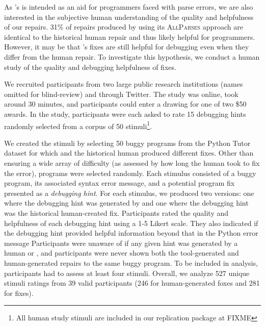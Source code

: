 As \toolname's is intended as an aid for programmers
faced with parse errors, we are also interested in the subjective
human understanding of the quality
and helpfulness of our repairs. 31\% of repairs produced by \toolname
using its \textsc{AllParses} approach are identical to the historical human repair
and thus likely helpful for programmers. However, it may be that \toolname's fixes
are still helpful for debugging even when they differ from the human
repair. To investigate this hypothesis, we conduct a human study of the quality and
debugging helpfulness of \toolname fixes.

 We recruited participants from two large public
research institutions (names omitted for blind-review) and through Twitter.
The study was online, took around 30 minutes, and participants could enter a
drawing for one of two \$50 awards. In the study, participants
were each asked to rate 15 debugging hints randomly selected from a corpus of 50
stimuli\footnote{All human study stimuli are included in our replication
package at FIXME}.

We created the stimuli by selecting 50 buggy programs from the Python Tutor dataset
for which \toolname and the historical human produced different fixes. Other than
ensuring a wide array of difficulty (as assessed by how long the
human took to fix the error), programs were selected randomly. Each
stimulus consisted of a buggy program, its associated syntax
error message, and a potential program fix presented as a \emph{debugging hint}.
For each stimulus, we produced two versions: one where the debugging hint was
generated by \toolname and one where the debugging hint was the historical
human-created fix.
Participants rated the quality and helpfulness of each debugging
hint using a 1-5 Likert scale.
They also indicated if the debugging hint provided helpful information beyond
that in the Python error message %
Participants were unaware of if any given
hint was generated by a human or \toolname, and participants were never shown both the
tool-generated and human-generated repairs to the same buggy program. To be included
in analysis, participants had to assess at
least four stimuli. Overall, we analyze 527 unique stimuli ratings from 39 valid
participants (246 for human-generated foxes and 281 for \toolname fixes).

